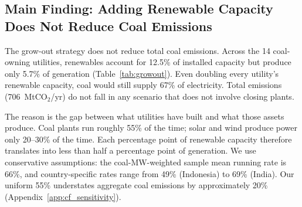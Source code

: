 \documentclass[review,3p,authoryear]{elsarticle}
\begin{document}
\subsection{Main Finding: Adding Renewable Capacity Does Not Reduce Coal Emissions}
\label{sec:results_generation}

The grow-out strategy does not reduce total coal emissions. Across the 14 coal-owning utilities, renewables account for 12.5\% of installed capacity but produce only 5.7\% of generation (Table~\ref{tab:growout}). Even doubling every utility's renewable capacity, coal would still supply 67\% of electricity. Total emissions (706~MtCO$_2$/yr) do not fall in any scenario that does not involve closing plants.


The reason is the gap between what utilities have built and what those assets produce. Coal plants run roughly 55\% of the time; solar and wind produce power only 20--30\% of the time. Each percentage point of renewable capacity therefore translates into less than half a percentage point of generation. We use conservative assumptions: the coal-MW-weighted sample mean running rate is 66\%, and country-specific rates range from 49\% (Indonesia) to 69\% (India). Our uniform 55\% understates aggregate coal emissions by approximately 20\% (Appendix~\ref{app:cf_sensitivity}).
\end{document}
